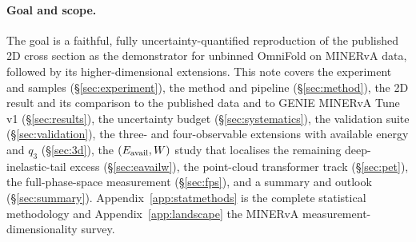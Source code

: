 \paragraph{Goal and scope.}
The goal is a faithful, fully uncertainty-quantified reproduction of the
published 2D cross section as the demonstrator for unbinned OmniFold on MINERvA
data, followed by its higher-dimensional extensions. This note covers the
experiment and samples (\S\ref{sec:experiment}), the method and pipeline
(\S\ref{sec:method}), the 2D result and its comparison to the published data
and to GENIE MINERvA Tune v1 (\S\ref{sec:results}), the uncertainty budget
(\S\ref{sec:systematics}), the validation suite (\S\ref{sec:validation}), the
three- and four-observable extensions with available energy and $q_{3}$
(\S\ref{sec:3d}), the $(E_{\mathrm{avail}},W)$ study that localises the remaining
deep-inelastic-tail excess (\S\ref{sec:eavailw}), the point-cloud transformer
track (\S\ref{sec:pet}), the full-phase-space measurement
(\S\ref{sec:fps}), and a summary and outlook (\S\ref{sec:summary}).
Appendix~\ref{app:statmethods} is the complete statistical methodology and
Appendix~\ref{app:landscape} the MINERvA measurement-dimensionality survey.
